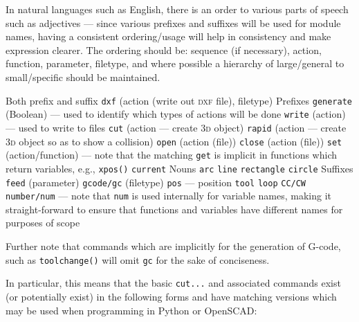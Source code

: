 \documentclass{ltxdoc}
\begin{document}
In natural languages such as English, there is an order to various parts of speech such as adjectives 
--- since various prefixes and suffixes will be used for module names, having a consistent ordering/usage will help in consistency and make expression clearer. The ordering should be: sequence (if necessary), action, function, parameter, filetype, and where possible a hierarchy of large/general to small/specific should be maintained.

\begin{outline}
\1 Both prefix and suffix
\2 \texttt{dxf} (action (write out \textsc{dxf} file), filetype)
\1 Prefixes
\2 \texttt{generate} (Boolean) --- used to identify which types of actions will be done
\2 \texttt{write} (action) --- used to write to files
\2 \texttt{cut} (action --- create \textsc{3d} object)
\2 \texttt{rapid} (action --- create \textsc{3d} object so as to show a collision)
\2 \texttt{open} (action (file))
\2 \texttt{close} (action (file))
\2 \texttt{set} (action/function) --- note that the matching \verb|get| is implicit in functions which return variables, e.g., \verb|xpos()|
\2 \texttt{current}
\1 Nouns
\2 \texttt{arc}
\2 \texttt{line}
\2 \texttt{rectangle}
\2 \texttt{circle}
\1 Suffixes
\2 \texttt{feed} (parameter)
\2 \texttt{gcode/gc} (filetype)
\2 \texttt{pos} --- position
\2 \texttt{tool}
\2 \texttt{loop}
\2 \texttt{CC/CW}
\2 \texttt{number/num} --- note that \verb|num| is used internally for variable names, making it straight-forward to ensure that functions and variables have different names for purposes of scope
\end{outline}

\noindent Further note that commands which are implicitly for the generation of G-code, such as \verb|toolchange()| will omit \verb|gc| for the sake of conciseness.

In particular, this means that the basic \verb|cut...| and associated commands exist (or potentially exist) in the following forms and have matching versions which may be used when programming in Python or OpenSCAD:

\bigskip
\end{document}

